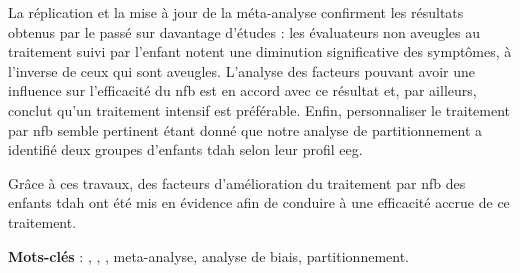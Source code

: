 La réplication et la mise à jour de la méta-analyse confirment les résultats obtenus par le passé sur davantage d'études : les évaluateurs non aveugles au traitement suivi par 
l'enfant notent une diminution significative des symptômes, à l'inverse de ceux qui sont aveugles. L'analyse des facteurs pouvant avoir une influence sur l'efficacité du \gls{nfb}
est en accord avec ce résultat et, par ailleurs, conclut qu'un traitement intensif est préférable. Enfin, personnaliser le traitement par \gls{nfb} semble pertinent étant donné que notre 
analyse de partitionnement a identifié deux groupes d'enfants \gls{tdah} selon leur profil \gls{eeg}.

Grâce à ces travaux, des facteurs d'amélioration du traitement par \gls{nfb} des enfants \gls{tdah} ont été mis en évidence afin de conduire à une efficacité accrue de ce traitement.




\large{\textbf{Mots-clés}} : , , , meta-analyse, analyse de biais, partitionnement.